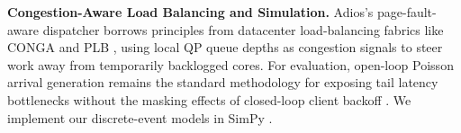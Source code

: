 \textbf{Congestion-Aware Load Balancing and Simulation.}
Adios's page-fault-aware dispatcher borrows principles from datacenter load-balancing fabrics like CONGA \cite{conga} and PLB \cite{plb}, using local QP queue depths as congestion signals to steer work away from temporarily backlogged cores. For evaluation, open-loop Poisson arrival generation remains the standard methodology for exposing tail latency bottlenecks without the masking effects of closed-loop client backoff \cite{leverich,tail,tales}. We implement our discrete-event models in SimPy \cite{simpy}.
